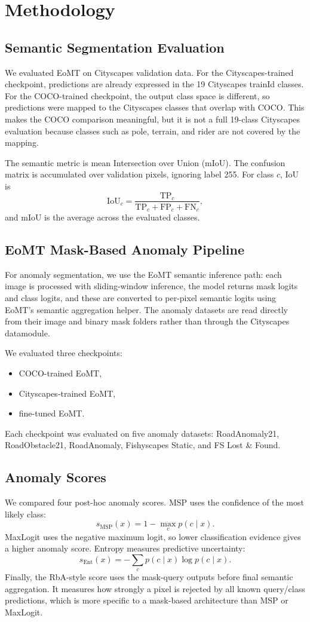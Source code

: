 \section{Methodology}
\subsection{Semantic Segmentation Evaluation}
We evaluated EoMT on Cityscapes validation data. For the Cityscapes-trained checkpoint, predictions are already expressed in the 19 Cityscapes trainId classes. For the COCO-trained checkpoint, the output class space is different, so predictions were mapped to the Cityscapes classes that overlap with COCO. This makes the COCO comparison meaningful, but it is not a full 19-class Cityscapes evaluation because classes such as pole, terrain, and rider are not covered by the mapping.

The semantic metric is mean Intersection over Union (mIoU). The confusion matrix is accumulated over validation pixels, ignoring label 255. For class $c$, IoU is
\[
\mathrm{IoU}_c = \frac{\mathrm{TP}_c}{\mathrm{TP}_c + \mathrm{FP}_c + \mathrm{FN}_c},
\]
and mIoU is the average across the evaluated classes.

\subsection{EoMT Mask-Based Anomaly Pipeline}
For anomaly segmentation, we use the EoMT semantic inference path: each image is processed with sliding-window inference, the model returns mask logits and class logits, and these are converted to per-pixel semantic logits using EoMT's semantic aggregation helper. The anomaly datasets are read directly from their image and binary mask folders rather than through the Cityscapes datamodule.

We evaluated three checkpoints:
\begin{itemize}
    \item COCO-trained EoMT,
    \item Cityscapes-trained EoMT,
    \item fine-tuned EoMT.
\end{itemize}
Each checkpoint was evaluated on five anomaly datasets: RoadAnomaly21, RoadObstacle21, RoadAnomaly, Fishyscapes Static, and FS Lost \& Found.

\subsection{Anomaly Scores}
We compared four post-hoc anomaly scores. MSP uses the confidence of the most likely class:
\[
s_{\mathrm{MSP}}(x) = 1 - \max_c p(c \mid x).
\]
MaxLogit uses the negative maximum logit, so lower classification evidence gives a higher anomaly score. Entropy measures predictive uncertainty:
\[
s_{\mathrm{Ent}}(x) = -\sum_c p(c \mid x)\log p(c \mid x).
\]
Finally, the RbA-style score uses the mask-query outputs before final semantic aggregation. It measures how strongly a pixel is rejected by all known query/class predictions, which is more specific to a mask-based architecture than MSP or MaxLogit.


